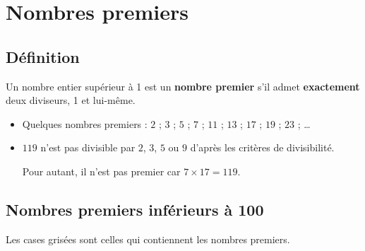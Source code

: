 \section{Nombres premiers}
\subsection{Définition}
\begin{definition}
	Un nombre entier supérieur à 1 est un \textbf{nombre premier} s'il admet \textbf{exactement} deux diviseurs, 1 et lui-même.
\end{definition}

\begin{remarque}
	\begin{itemize}
		\item Quelques nombres premiers : $2$ ; $3$ ; $5$ ; $7$ ; $11$ ; $13$ ; $17$ ; $19$ ; $23$ ; \ldots
		\item $119$ n'est pas divisible par $2$, $3$, $5$ ou $9$ d'après les critères de divisibilité.
		
		Pour autant, il n'est pas premier car $7\times 17 = 119$. 
	\end{itemize}
\end{remarque}	

\subsection{Nombres premiers inférieurs à 100}
Les cases grisées sont celles qui contiennent les nombres premiers.

